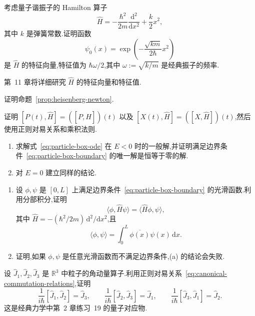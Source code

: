 \begin{exercise}\label{ex:harmonic-oscillator-ground}
考虑量子谐振子的 Hamilton 算子
\[
\widehat H=-\frac{\hbar^{2}}{2m}\frac{\mathrm{d}^{2}}{\mathrm{d}x^{2}}+\frac{k}{2}x^{2},
\]
其中 \(k\) 是弹簧常数.证明函数
\[
\psi_{0}(x)=\exp\left(-\frac{\sqrt{km}}{2\hbar}x^{2}\right)
\]
是 \(\widehat H\) 的特征向量,特征值为 \(\hbar\omega/2\),其中 \(\omega:=\sqrt{k/m}\) 是经典振子的频率.
\begin{note}
第~11 章将详细研究 \(\widehat H\) 的特征向量和特征值.
\end{note}
\end{exercise}

\begin{exercise}\label{ex:prove-heisenberg-equations}
证明命题~\ref{prop:heisenberg-newton}.
\begin{solution}
证明 \([P(t),\widehat H]=([P,\widehat H])(t)\) 以及 \([X(t),\widehat H]=([X,\widehat H])(t)\),然后使用正则对易关系和乘积法则.
\end{solution}
\end{exercise}

\begin{exercise}\label{ex:negative-box-energy}
\begin{enumerate}
\item 求解式~\eqref{eq:particle-box-ode} 在 \(E<0\) 时的一般解,并证明满足边界条件~\eqref{eq:particle-box-boundary} 的唯一解是恒等于零的解.
\item 对 \(E=0\) 建立同样的结论.
\end{enumerate}
\end{exercise}

\begin{exercise}\label{ex:box-integration-by-parts}
\begin{enumerate}
\item 设 \(\phi,\psi\) 是 \([0,L]\) 上满足边界条件~\eqref{eq:particle-box-boundary} 的光滑函数.利用分部积分,证明
\[
\langle\phi,\widehat H\psi\rangle=\langle\widehat H\phi,\psi\rangle,
\]
其中 \(\widehat H=-(\hbar^{2}/2m)\,\mathrm{d}^{2}/\mathrm{d}x^{2}\),且
\[
\langle\phi,\psi\rangle=\int_{0}^{L}\overline{\phi(x)}\psi(x)\,\mathrm{d}x.
\]
\item 证明,如果 \(\phi,\psi\) 是任意光滑函数而不满足边界条件,(a) 的结论会失败.
\end{enumerate}
\end{exercise}

\begin{exercise}\label{ex:angular-momentum-commutators}
设 \(\widehat J_{1},\widehat J_{2},\widehat J_{3}\) 是 \(\mathbb{R}^{3}\) 中粒子的角动量算子.利用正则对易关系~\eqref{eq:canonical-commutation-relations},证明
\[
\frac{1}{i\hbar}[\widehat J_{1},\widehat J_{2}]=\widehat J_{3},
\qquad
\frac{1}{i\hbar}[\widehat J_{2},\widehat J_{3}]=\widehat J_{1},
\qquad
\frac{1}{i\hbar}[\widehat J_{3},\widehat J_{1}]=\widehat J_{2}.
\]
这是经典力学中第~2 章练习~19 的量子对应物.
\end{exercise}
